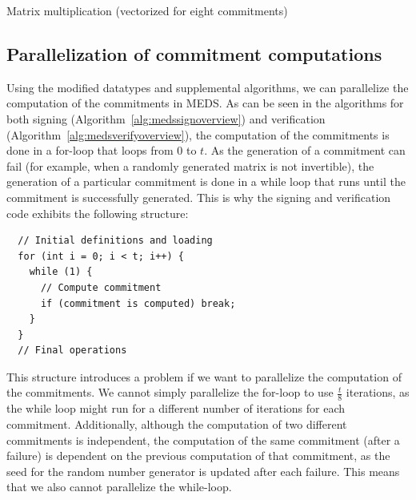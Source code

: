 \documentclass[11pt,a4paper]{report}
\theoremstyle{definition}
\begin{document}
\begin{samepage}
\begin{algorithm}
  \caption{Matrix multiplication (vectorized for eight commitments)}
  \label{alg:medsmatrixmultiplicationvec}
  
\end{algorithm}

\subsection{Parallelization of commitment computations}
\label{sec:commitmentparallelization}
\end{samepage}
Using the modified datatypes and supplemental algorithms, we can parallelize the computation of the commitments in MEDS. As can be seen in the algorithms for both signing (Algorithm~\ref{alg:medssignoverview}) and verification (Algorithm~\ref{alg:medsverifyoverview}), the computation of the commitments is done in a for-loop that loops from $0$ to $t$. As the generation of a commitment can fail (for example, when a randomly generated matrix is not invertible), the generation of a particular commitment is done in a while loop that runs until the commitment is successfully generated. This is why the signing and verification code exhibits the following structure:
\begin{samepage}
\begin{verbatim}
  // Initial definitions and loading
  for (int i = 0; i < t; i++) {
    while (1) {
      // Compute commitment
      if (commitment is computed) break;
    }
  }
  // Final operations
\end{verbatim}
\end{samepage}
This structure introduces a problem if we want to parallelize the computation of the commitments. We cannot simply parallelize the for-loop to use $\frac{t}{8}$ iterations, as the while loop might run for a different number of iterations for each commitment. Additionally, although the computation of two different commitments is independent, the computation of the same commitment (after a failure) is dependent on the previous computation of that commitment, as the seed for the random number generator is updated after each failure. This means that we also cannot parallelize the while-loop.
\end{document}
